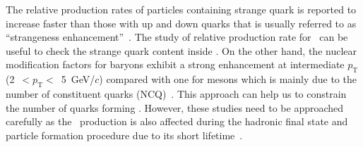 The relative production rates of particles containing strange quark is reported to increase faster than those with up and down quarks that is usually referred to as ``strangeness enhancement''~\cite{ALICE:2016fzo}. The study of relative production rate for \fzero\ can be useful to check the strange quark content inside \fzero. On the other hand, the nuclear modification factors for baryons exhibit a strong enhancement at intermediate $p_{\mathrm{T}}$ (2~$<p_{\mathrm{T}}<$~5~GeV/$c$) compared with one for mesons which is mainly due to the number of constituent quarks (NCQ)~\cite{Cronin:1974zm,Fries:2003vb}. This approach can help us to constrain the number of quarks forming \fzero. However, these studies need to be approached carefully as the \fzero\ production is also affected during the hadronic final state and particle formation procedure due to its short lifetime~\cite{ParticleDataGroup:2020ssz}.  






